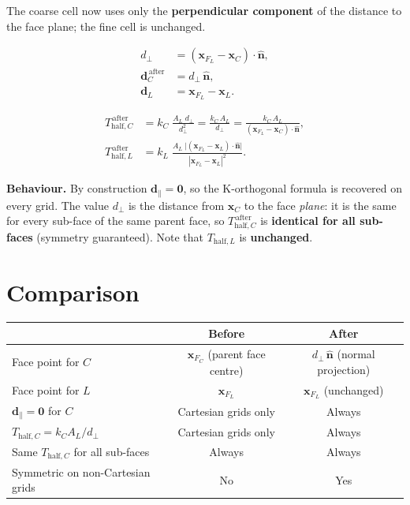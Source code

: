 \documentclass[11pt,a4paper]{article}
\begin{document}
The coarse cell now uses only the \textbf{perpendicular component} of
the distance to the face plane; the fine cell is unchanged.

\begin{align}
  d_\perp
    &= (\mathbf{x}_{F_L}-\mathbf{x}_C)\cdot\hat{\mathbf{n}}, \\[6pt]
  \mathbf{d}_C^{\,\text{after}}
    &= d_\perp\,\hat{\mathbf{n}}, \label{eq:dafter_C}\\[6pt]
  \mathbf{d}_L
    &= \mathbf{x}_{F_L} - \mathbf{x}_L.
\end{align}

\begin{align}
  T_{\mathrm{half},C}^{\,\text{after}}
    &= k_C\;\frac{A_L\;d_\perp}{d_\perp^{2}}
     = \frac{k_C\,A_L}{d_\perp}
     = \frac{k_C\,A_L}
            {(\mathbf{x}_{F_L}-\mathbf{x}_C)\cdot\hat{\mathbf{n}}},
    \label{eq:Tafter_C}\\[10pt]
  T_{\mathrm{half},L}^{\,\text{after}}
    &= k_L\;\frac{A_L\;\bigl|(\mathbf{x}_{F_L}-\mathbf{x}_L)
                              \cdot\hat{\mathbf{n}}\bigr|}
                 {|\mathbf{x}_{F_L}-\mathbf{x}_L|^{2}}.
    \label{eq:Tafter_L}
\end{align}

\medskip
\noindent\textbf{Behaviour.}
By construction $\mathbf{d}_\parallel = \mathbf{0}$, so the K-orthogonal
formula is recovered on every grid.
The value $d_\perp$ is the distance from $\mathbf{x}_C$ to the face
\emph{plane}: it is the same for every sub-face of the same parent face,
so $T_{\mathrm{half},C}^{\,\text{after}}$ is \textbf{identical for all
sub-faces} (symmetry guaranteed).
Note that $T_{\mathrm{half},L}$ is \textbf{unchanged}.

\section*{Comparison}

\begin{center}
\begin{tabular}{lcc}
\toprule
 & \textbf{Before} & \textbf{After} \\
\midrule
Face point for $C$
  & $\mathbf{x}_{F_C}$ (parent face centre)
  & $d_\perp\,\hat{\mathbf{n}}$ (normal projection) \\[4pt]
Face point for $L$
  & $\mathbf{x}_{F_L}$
  & $\mathbf{x}_{F_L}$ \quad (unchanged) \\[4pt]
$\mathbf{d}_\parallel = \mathbf{0}$ for $C$
  & Cartesian grids only
  & Always \\[4pt]
$T_{\mathrm{half},C} = k_C A_L / d_\perp$
  & Cartesian grids only
  & Always \\[4pt]
Same $T_{\mathrm{half},C}$ for all sub-faces
  & Always
  & Always \\[4pt]
Symmetric on non-Cartesian grids
  & No
  & Yes \\
\bottomrule
\end{tabular}
\end{center}
\end{document}
